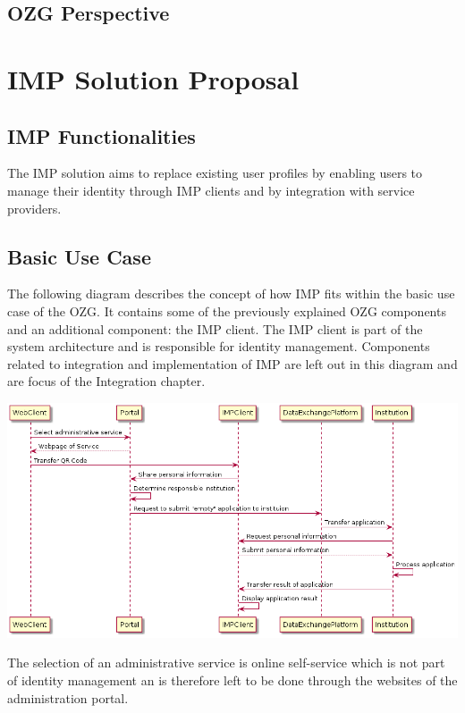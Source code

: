 \documentclass[
     12pt,         %
     a4paper,      %
     BCOR=10mm,version=first,     %
     DIV=14,version=first,        %
     ]{scrreprt}
\begin{document}
\subsection{OZG Perspective}

\section{IMP Solution Proposal}

\subsection{IMP Functionalities}

The IMP solution aims to replace existing user profiles by enabling users to manage their identity through IMP clients and by integration with service providers.

\subsection{Basic Use Case}

The following diagram describes the concept of how IMP fits within the basic use case of the OZG. It contains some of the previously explained OZG components and an additional component: the IMP client. The IMP client is part of the system architecture and is responsible for identity management. Components related to integration and implementation of IMP are left out in this diagram and are focus of the Integration chapter. 

\includegraphics[width=15cm]{Basic Use Case IMP.png}

The selection of an administrative service is online self-service which is not part of identity management an is therefore left to be done through the websites of the administration portal. 
\end{document}
